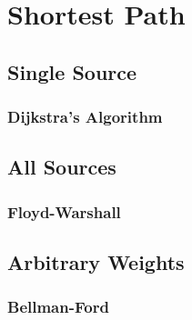 \chapter{Shortest Path}

\section{Single Source}

\subsection{Dijkstra's Algorithm}

\section{All Sources}

\subsection{Floyd-Warshall}

\section{Arbitrary Weights}

\subsection{Bellman-Ford}
